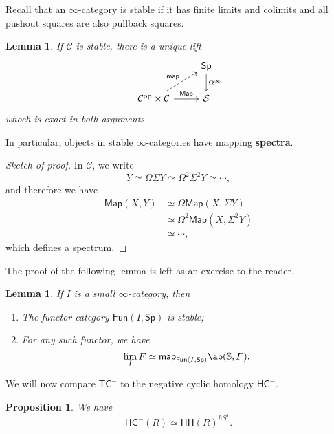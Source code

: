 \documentclass[10pt, oneside]{memoir}
\newtheorem{prop}[thm]{Proposition}
\newtheorem{lem}[thm]{Lemma}
\theoremstyle{definition}
\theoremstyle{remark}
\theoremstyle{plain}
\theoremstyle{definition}
\theoremstyle{remark}
\newcommand{\bS}{\mathbb{S}}
\newcommand{\mc}[1]{\mathcal{#1}}
\newcommand{\ms}[1]{\mathsf{#1}}
\newcommand{\1}{\mathbf{1}}
\newcommand{\2}{\mathbf{2}}
\newcommand{\3}{\mathbf{3}}
\newcommand{\HC}{\ms{HC}}
\newcommand{\TC}{\ms{TC}}
\newcommand{\HH}{\ms{HH}}
\DeclareMathOperator{\op}{op}
\begin{document}
Recall that an $\infty$-category is stable if it has finite limits and colimits and all pushout squares are also pullback squares.

\begin{lem}
    If $\mc{C}$ is stable, there is a unique lift
    \begin{equation*}
    \begin{tikzcd}
        & \ms{Sp} \ar{d}{\Omega^{\infty}} \\
        \mc{C}^{\op} \times \mc{C} \ar{r}{\ms{Map}} \ar[dashrightarrow]{ur}{\ms{map}} & \mc{S}
    \end{tikzcd}
    \end{equation*}
    whoch is exact in both arguments.
\end{lem}

In particular, objects in stable $\infty$-categories have mapping \textbf{spectra}.

\begin{proof}[Sketch of proof]
    In $\mc{C}$, we write
    \[ Y \simeq \Omega \Sigma Y \simeq \Omega^2 \Sigma^2 Y \simeq \cdots, \]
    and therefore we have
    \begin{align*}
        \ms{Map}(X,Y) &\simeq \Omega \ms{Map}(X, \Sigma Y) \\
        &\simeq \Omega^2 \ms{Map}(X, \Sigma^2 Y) \\
        &\simeq \cdots,
    \end{align*}
    which defines a spectrum.
\end{proof}

The proof of the following lemma is left as an exercise to the reader.

\begin{lem}
    If $I$ is a small $\infty$-category, then
    \begin{enumerate}
        \item The functor category $\ms{Fun}(I, \ms{Sp})$ is stable;
        \item For any such functor, we have
        \[ \lim_I F \simeq \ms{map}_{\ms{Fun}(I, \ms{Sp})} \ab( \bS, F). \]
    \end{enumerate}
\end{lem}

We will now compare $\TC^-$ to the negative cyclic homology $\HC^-$.

\begin{prop}
    We have
    \[ \HC^-(R) \simeq \HH(R)^{hS^1}. \]
\end{prop}
\end{document}
